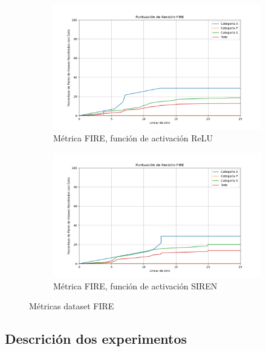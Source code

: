 \begin{figure}[tbp]
    \centering
    \begin{subfigure}[b]{0.5\textwidth}
        \centering
        \includegraphics[width=\textwidth]{imaxes/FIRE_scores/fire_registration_score_ReLU.png}
        \caption{Métrica FIRE, función de activación ReLU}
        \label{fig:FIRE_relu}
    \end{subfigure}\hfill
    \begin{subfigure}[b]{0.5\textwidth}
        \centering
        \includegraphics[width=\textwidth]{imaxes/FIRE_scores/fire_registration_scores_SIREN.png}
        \caption{Métrica FIRE, función de activación SIREN}
        \label{fig:FIRE_SIREN}
    \end{subfigure}
    \caption{Métricas dataset FIRE}
    \label{fig:FIRE_scores}
\end{figure}

\subsection{Descrición dos experimentos}
\label{subsec:Descrición dos experimentos}

